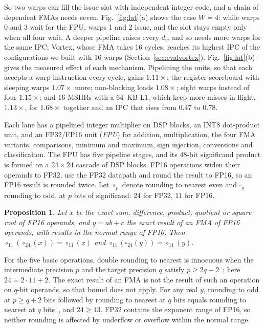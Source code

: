 \documentclass[journal]{IEEEtran}
\newtheorem{proposition}{Proposition}
\begin{document}
So two warps can fill the issue slot with independent integer code, and a chain of
dependent FMAs needs seven. Fig.~\ref{fig:lat}(a) shows the case $W=4$: while
warps 0 and 3 wait for the FPU, warps 1 and 2 issue, and the slot stays empty only
when all four wait. A deeper pipeline raises every $d_w$ and so needs more warps for
the same IPC; Vortex, whose FMA takes 16 cycles, reaches its highest IPC of the
configurations we built with 16 warps (Section~\ref{sec:evalvortex}). Fig.~\ref{fig:lat}(b) gives the measured effect
of each mechanism. Pipelining the units, so that each accepts a warp instruction every
cycle, gains $1.11\times$; the register scoreboard with sleeping warps $1.07\times$
more; non-blocking loads $1.08\times$; eight warps instead of four $1.15\times$; and
16 MSHRs with a 64~KB L1, which keep more misses in flight, $1.13\times$, for
$1.68\times$ together and an IPC that rises from 0.47 to 0.78.

Each lane has a
pipelined integer multiplier on DSP blocks, an INT8 dot-product unit, and an
FP32/FP16 unit (\emph{FPU}) for addition, multiplication, the four FMA variants,
comparisons, minimum and maximum, sign injection, conversions and
classification. The FPU has five pipeline stages, and its 48-bit significand
product is formed on a $24\times24$ cascade of DSP blocks. FP16 operations widen
their operands to FP32, use the FP32 datapath and round the result to FP16, so an
FP16 result is rounded twice. Let $\circ_p$ denote rounding to nearest even and
$\square_p$ rounding to odd, at $p$ bits of significand: 24 for FP32, 11 for FP16.

\begin{proposition}\label{prop:fp16}
Let $x$ be the exact sum, difference, product, quotient or square root of FP16
operands, and $y=ab+c$ the exact result of an FMA of FP16 operands, with results in
the normal range of FP16. Then $\circ_{11}(\circ_{24}(x))=\circ_{11}(x)$ and
$\circ_{11}(\square_{24}(y))=\circ_{11}(y)$.
\end{proposition}
\begin{IEEEproof}
For the five basic operations, double rounding to nearest is innocuous when the
intermediate precision $p$ and the target precision $q$ satisfy
$p\ge2q+2$~\cite{figueroa}; here $24=2\cdot11+2$. The exact result of an FMA is not
the result of such an operation on $q$-bit operands, so that bound does not apply.
For any real $y$, rounding to odd at $p\ge q+2$ bits followed by rounding to nearest
at $q$ bits equals rounding to nearest at $q$ bits~\cite{boldo}, and $24\ge13$. FP32
contains the exponent range of FP16, so neither rounding is affected by underflow or
overflow within the normal range.
\end{IEEEproof}
\end{document}
